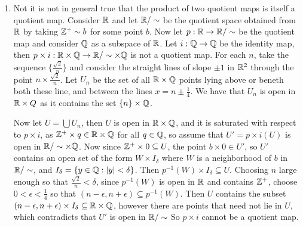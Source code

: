 \begin{example}
\begin{enumerate}[label=(\arabic*)]
        \item Not it is not in general true that the product of two quotient maps is itself a
            quotient map. Consider $\mathbb{R}$ and let  $\mathbb{R}/\sim$ be the quotient space obtained from  $\mathbb{R}$
            by taking $\mathbb{Z}^+ \sim b$ for some point  $b$. Now let  $p:\mathbb{R} \rightarrow \mathbb{R}/\sim$ be the
            quotient map and consider  $\mathbb{Q}$ as a subspace of  $\mathbb{R}$. Let  $i:\mathbb{Q} \rightarrow \mathbb{Q}$ be
            the identity map, then  $p \times i:\mathbb{R} \times \mathbb{Q} \rightarrow \mathbb{R}/\sim \times \mathbb{Q}$ is not a
            quotient map. For each  $n$, take the sequence  $\{\frac{\sqrt{2}}{n}\}$ and consider
            the straight lines of slope $\pm1$ in $\mathbb{R}^2$ through the point  $n \times
            \frac{\sqrt{2}}{n}$. Let $U_n$ be the set of all  $\mathbb{R} \times \mathbb{Q}$ points lying above or
            beneth both these line, and between the lines  $x=n \pm \frac{1}{4}$. We have that $U_n$
            is open in  $\mathbb{R} \times Q$ as it contains the set  $\{n\} \times \mathbb{Q}$.

            Now let $U=\bigcup{U_n}$, then $U$ is open in  $\mathbb{R} \times \mathbb{Q}$, and it is saturated with
            respect to  $p \times i$, as  $\mathbb{Z}^+ \times q \in \mathbb{R} \times \mathbb{Q}$ for all  $q \in \mathbb{Q}$, so
            assume that  $U'=p \times i(U)$ is open in $\mathbb{R}/\sim \times \mathbb{Q}$. Now since  $\mathbb{Z}^+ \times
            0 \subseteq U$, the point  $b \times 0 \in U'$, so  $U'$ contains an open set of the
            form  $W \times I_{\delta}$ where $W$ is a neighborhood of  $b$ in  $\mathbb{R}/\sim$, and
            $I_{\delta}=\{y \in \mathbb{Q}:|y|<\delta\}$. Then $p^{-1}(W) \times I_{\delta} \subseteq U$.
            Choosing $n$ large enough so that  $ \frac{\sqrt{2}}{n}<\delta$, since $p^{-1}(W)$ is
            open in $\mathbb{R}$ and contains  $\mathbb{Z}^+$, choose  $0<\epsilon<\frac{1}{4}$ so that
            $(n-\epsilon,n+\epsilon) \subseteq p^{-1}(W)$. Then $U$ contains the subset
            $(n-\epsilon,n+\epsilon) \times I_{\delta} \subseteq \mathbb{R} \times \mathbb{Q}$, however there are
            points that need not lie in $U$, which contradicts that  $U'$ is open in $\mathbb{R}/\sim$ So
            $p \times i$ cannot be a quotient map.
    \end{enumerate}
\end{example} 
